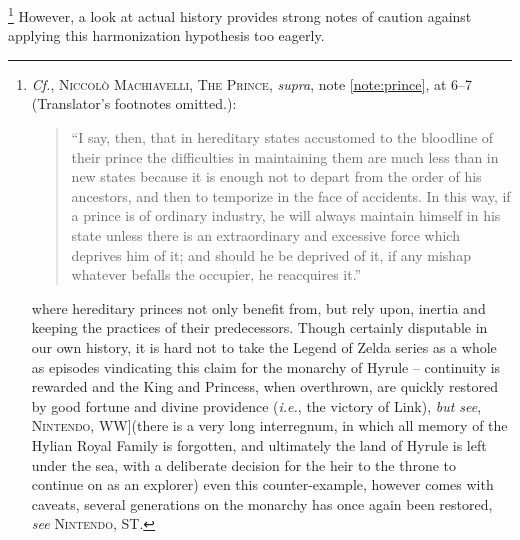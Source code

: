 \documentclass[../FGP.tex]{subfiles}
\begin{document}
  \footnote{\textit{Cf.}, \textsc{Niccolò Machiavelli, The Prince}, \textit{supra}, note \ref{note:prince}, at 6--7 (Translator's footnotes omitted.): \begin{quote}
  ``I say, then, that in hereditary states accustomed to the bloodline of their prince the difficulties in maintaining them are much less than in new states because it is enough not to depart from the order of his ancestors, and then to temporize in the face of accidents. In this way, if a prince is of ordinary industry, he will always maintain himself in his state unless there is an extraordinary and excessive force which deprives him of it; and should he be deprived of it, if any mishap whatever befalls the occupier, he reacquires it.''
  \end{quote}where hereditary princes not only benefit from, but rely upon, inertia and keeping the practices of their predecessors. Though certainly disputable in our own history, it is hard not to take the Legend of Zelda series as a whole as episodes vindicating this claim for the monarchy of Hyrule -- continuity is rewarded and the King and Princess, when overthrown, are quickly restored by good fortune and divine providence (\emph{i.e.}, the victory of Link), \textit{but see}, \textsc{Nintendo, WW}](there is a very long interregnum, in which all memory of the Hylian Royal Family is forgotten, and ultimately the land of Hyrule is left under the sea, with a deliberate decision for the heir to the throne to continue on as an explorer) even this counter-example, however comes with caveats, several generations on the monarchy has once again been restored, \textit{see} \textsc{Nintendo, ST}.} 
However, a look at actual history provides strong notes of caution against applying this harmonization hypothesis too eagerly.
\end{document}

